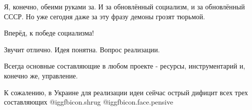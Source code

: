 \begin{itemize}
\begin{itemize}

Я, конечно, обеими руками за. И за обновлённый социализм, и за обновлённый
СССР. Но уже сегодня даже за эту фразу демоны грозят тюрьмой.

\end{itemize} %

Вперёд, к победе социализма!


Звучит отлично. Идея понятна. Вопрос реализации.

Всегда основные составляющие в любом проекте - ресурсы, инструментарий и,
конечно же, управление.

К сожалению, в Украине для реализации идеи сейчас острый дифицит всех трех
составляющих  @igg{fbicon.shrug}  @igg{fbicon.face.pensive} 

\end{itemize} %
